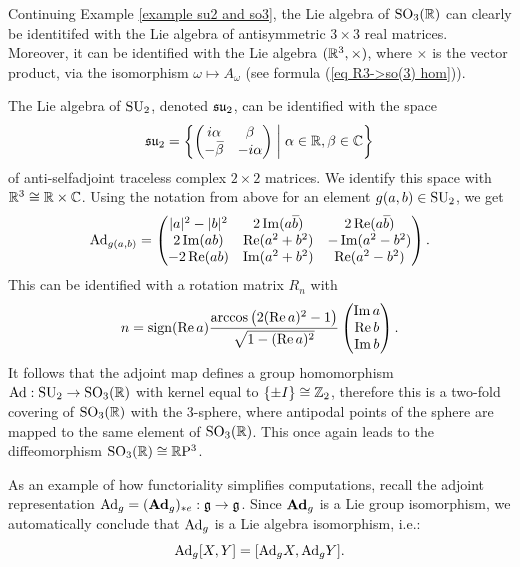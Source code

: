 \begin{example}\label{example Lie algebras of so3 and su2}
    Continuing Example \ref{example su2 and so3}, 
    the Lie algebra of $\operatorname{SO}_3(\mathbb{R})$ can clearly be identitifed with the Lie algebra of antisymmetric $3\times 3$ real matrices. Moreover, it can be identified with the Lie algebra $(\mathbb{R}^3,\times)$, where $\times$ is the vector product, via the isomorphism $\omega\mapsto A_{\omega}$ (see formula (\ref{eq R3->so(3) hom})). 
    
    The Lie algebra of $\operatorname{SU}_2$, denoted $\mathfrak{su}_2$, can be identified with the space
    \[\fraksu_2=\left\{
    \begin{pmatrix}
        i\alpha&\beta\\-\wb{\beta}&-i\alpha
    \end{pmatrix}
    \middle| \alpha\in\bbR,\beta\in\bbC
    \right\}\]
    of anti-selfadjoint traceless complex $2\times 2$ matrices. We identify this space with $\mathbb{R}^3\cong \mathbb{R}\times \mathbb{C}$. Using the notation from above for an element $g(a,b)\in\operatorname{SU}_2$, we get
    \[\Ad_{g(a,b)}=
    \begin{pmatrix}
        |a|^2-|b|^2&2\Im (a\wb{b}) & 2\Re(a\wb{b}) \\
        2\Im(ab) & \Re(a^2+b^2) & -\Im(a^2-b^2)\\
        -2\Re(ab) & \Im(a^2+b^2) & \Re(a^2-b^2)
    \end{pmatrix}.\label{eq Ad: su2->so3}
    \]
    This can be identified with a rotation matrix $R_n$ with
    \[n=\operatorname{sign}(\operatorname{Re} a)\frac{\arccos\left(2(\operatorname{Re} a)^2-1\right)}{\sqrt{1-(\operatorname{Re} a)^2}}
    \begin{pmatrix}
        \operatorname{Im} a\\ \operatorname{Re} b \\ \operatorname{Im} b
    \end{pmatrix}.
    \]
    It follows that the adjoint map defines a group homomorphism $\mathrm{Ad}:\operatorname{SU}_2\to \operatorname{SO}_3(\mathbb{R})$ with kernel equal to $\{\pm I\}\cong \mathbb{Z}_2$, therefore this is a two-fold covering of $\operatorname{SO}_3(\mathbb{R})$ with the 3-sphere, where antipodal points of the sphere are mapped to the same element of $\operatorname{SO}_3(\mathbb{R})$. This once again leads to the diffeomorphism $\operatorname{SO}_3(\mathbb{R})\cong \mathbb{R}\mathrm{P}^3$.
\end{example}



\begin{example}
    As an example of how functoriality simplifies computations, recall the adjoint representation $\mathrm{Ad}_g=(\mathrm{\mathbf{Ad}}_g)_{\ast e}:\mathfrak{g}\to \mathfrak{g}$. Since $\mathrm{\mathbf{Ad}}_g$ is a Lie group isomorphism, we automatically conclude that $\mathrm{Ad}_g$ is a Lie algebra isomorphism, i.e.:
    \[\mathrm{Ad}_g[X,Y]=[\mathrm{Ad}_g X,\mathrm{Ad}_g Y].\]
\end{example}

